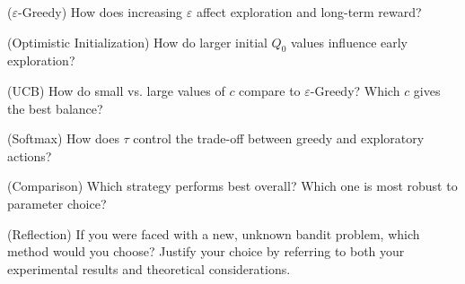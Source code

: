 \documentclass[addpoints,10pt,answers]{exam}
\begin{document}
\begin{questions}

    \question ($\varepsilon$-Greedy) How does increasing $\varepsilon$ affect exploration and long-term reward?
    \begin{solution}
    \end{solution}

    \question (Optimistic Initialization) How do larger initial $Q_0$ values influence early exploration?
    \begin{solution}
    \end{solution}
    
    \question (UCB) How do small vs. large values of $c$ compare to $\varepsilon$-Greedy? Which $c$ gives the best balance?
    \begin{solution}
    \end{solution}
    
    \question (Softmax) How does $\tau$ control the trade-off between greedy and exploratory actions?
    \begin{solution}
    \end{solution}
    
    \question (Comparison) Which strategy performs best overall? Which one is most robust to parameter choice?
    \begin{solution}
    \end{solution}

    \question (Reflection) If you were faced with a new, unknown bandit problem, which method would you choose? Justify your choice by referring to both your experimental results and theoretical considerations.
    \begin{solution}
    \end{solution}

\end{questions}
\end{document}
